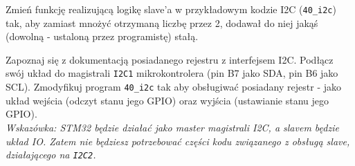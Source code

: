 \dbEntryCheckResults
Zmień funkcję realizującą logikę slave'a w przykładowym kodzie I2C (\Verb$40_i2c$) tak, aby zamiast mnożyć otrzymaną liczbę przez 2, dodawał do niej jakąś (dowolną - ustaloną przez programistę) stałą.
\fi

\dbEntryCheckResults
Zapoznaj się z dokumentacją posiadanego rejestru z interfejsem I2C. Podłącz swój układ do magistrali \Verb$I2C1$ mikrokontrolera (pin B7 jako SDA, pin B6 jako SCL).
Zmodyfikuj program \Verb$40_i2c$ tak aby obsługiwać posiadany rejestr - jako układ wejścia (odczyt stanu jego GPIO) oraz wyjścia (ustawianie stanu jego GPIO).\\
\textit{Wskazówka: STM32 będzie działać jako master magistrali I2C, a slavem będzie układ IO. Zatem nie będziesz potrzebować części kodu związanego z obsługą slave, działającego na \Verb$I2C2$.}
\fi
